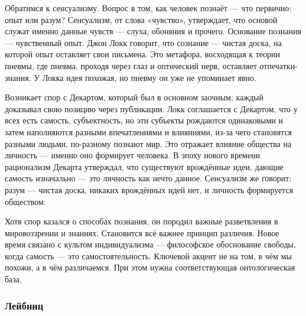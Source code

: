 Обратимся к сенсуализму. Вопрос в том, как человек познаёт --- что первично: опыт или разум? Сенсуализм, от слова «чувство», утверждает, что основой служат именно данные чувств --- слуха, обоняния и прочего. Основание познания --- чувственный опыт. Джон Локк говорит, что сознание --- чистая доска, на которой опыт оставляет свои письмена. Это метафора, восходящая к теории пневмы, где пневма, проходя через глаз и оптический нерв, оставляет отпечатки-знания. У Локка идея похожая, но пневму он уже не упоминает явно.

Возникает спор с Декартом, который был в основном заочным: каждый доказывал свою позицию через публикации. Локк соглашается с Декартом, что у всех есть самость, субъектность, но эти субъекты рождаются одинаковыми и затем наполняются разными впечатлениями и влияниями, из-за чего становятся разными людьми, по-разному познают мир. Это отражает влияние общества на личность --- именно оно формирует человека. В эпоху нового времени рационализм Декарта утверждал, что существуют врождённые идеи, дающие самость изначально --- это личность как нечто данное. Сенсуализм же говорит: разум --- чистая доска, никаких врождённых идей нет, и личность формируется обществом.

Хотя спор казался о способах познания, он породил важные разветвления в мировоззрении и знаниях. Становится всё важнее принцип различия. Новое время связано с культом индивидуализма --- философское обоснование свободы, когда самость --- это самостоятельность. Ключевой акцент не на том, в чём мы похожи, а в чём различаемся. При этом нужна соответствующая онтологическая база.

\subsubsection{Лейбниц}

